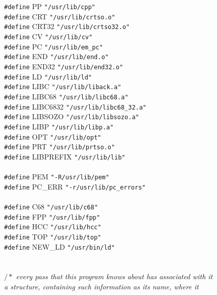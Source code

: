 \begin{flushleft}
{\tt \#define} PP     {\tt"/usr/lib/cpp"}\mbox{}\\
{\tt \#define} CRT    {\tt"/usr/lib/crtso.o"}\mbox{}\\
{\tt \#define} CRT32           {\tt"/usr/lib/crtso32.o"}\mbox{}\\
{\tt \#define} CV     {\tt"/usr/lib/cv"}\mbox{}\\
{\tt \#define} PC     {\tt"/usr/lib/em\_pc"}\mbox{}\\
{\tt \#define} END    {\tt"/usr/lib/end.o"}\mbox{}\\
{\tt \#define} END32           {\tt"/usr/lib/end32.o"}\mbox{}\\
{\tt \#define} LD     {\tt"/usr/lib/ld"}\mbox{}\\
{\tt \#define} LIBC      {\tt"/usr/lib/liback.a"}\mbox{}\\
{\tt \#define} LIBC68    {\tt"/usr/lib/libc68.a"}\mbox{}\\
{\tt \#define} LIBC6832        {\tt"/usr/lib/libc68\_32.a"}\mbox{}\\
{\tt \#define} LIBSOZO      {\tt"/usr/lib/libsozo.a"}\mbox{}\\
{\tt \#define} LIBP      {\tt"/usr/lib/libp.a"}\mbox{}\\
{\tt \#define} OPT    {\tt"/usr/lib/opt"}\mbox{}\\
{\tt \#define} PRT    {\tt"/usr/lib/prtso.o"}\mbox{}\\
{\tt \#define} LIBPREFIX {\tt"/usr/lib/lib"}\mbox{}\\
\mbox{}\\
{\tt \#define} PEM    {\tt"-R/usr/lib/pem"}\mbox{}\\
{\tt \#define} PC\_ERR    {\tt"-r/usr/lib/pc\_errors"}\mbox{}\\
\mbox{}\\
{\tt \#define} C68    {\tt"/usr/lib/c68"}\mbox{}\\
{\tt \#define} FPP    {\tt"/usr/lib/fpp"}\mbox{}\\
{\tt \#define} HCC    {\tt"/usr/lib/hcc"}\mbox{}\\
{\tt \#define} TOP    {\tt"/usr/lib/top"}\mbox{}\\
{\tt \#define} NEW\_LD    {\tt"/usr/bin/ld"}\mbox{}\\
\mbox{}\\
\mbox{}\\
{$/\ast$\it{} every pass that this program knows about has associated with it\mbox{}\\
\hspace*{3\indentation}a structure, containing such information as its name, where it\mbox{}\\
}
\end{flushleft}
